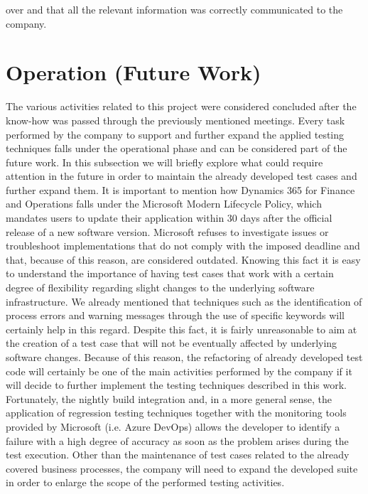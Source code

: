 over and that all the relevant information was correctly communicated to the company.

\section{Operation (Future Work)} 

The various activities related to this project were considered concluded after the know-how was passed through the previously mentioned meetings. Every task performed by the company to support and further expand the applied testing techniques falls under the operational phase and can be considered part of the future work. In this subsection we will briefly explore what could require attention in the future in order to maintain the already developed test cases and further expand them. 
It is important to mention how Dynamics 365 for Finance and Operations falls under the Microsoft Modern Lifecycle Policy, which mandates users to update their application within 30 days after the official release of a new software version. Microsoft refuses to investigate issues or troubleshoot implementations that do not comply with the imposed deadline and that, because of this reason, are considered outdated. Knowing this fact it is easy to understand the importance of having test cases that work with a certain degree of flexibility regarding slight changes to the underlying software infrastructure. We already mentioned that techniques such as the identification of process errors and warning messages through the use of specific keywords will certainly help in this regard. Despite this fact, it is fairly unreasonable to aim at the creation of a test case that will not be eventually affected by underlying software changes. Because of this reason, the refactoring of already developed test code will certainly be one of the main activities performed by the company if it will decide to further implement the testing techniques described in this work. Fortunately, the nightly build integration and, in a more general sense, the application of regression testing techniques together with the monitoring tools provided by Microsoft (i.e. Azure DevOps) allows the developer to identify a failure with a high degree of accuracy as soon as the problem arises during the test execution. 
Other than the maintenance of test cases related to the already covered business processes, the company will need to expand the developed suite in order to enlarge the scope of the performed testing activities. 

